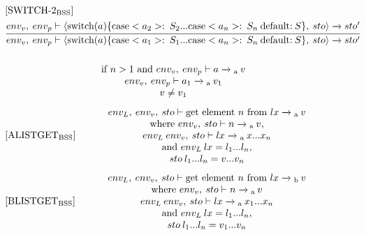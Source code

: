 \begin{equation}
\begin{split}
\begin{minipage}{\linewidth}
$[\text{SWITCH-2}_\text{BSS}]$
\end{minipage}
\\
\begin{minipage}{\linewidth}
\centering
$\cfrac
{
    env_v, \: env_p \vdash \langle  \text{switch}(a) \{\text{case} <a_2>: \: S_2 ... \text{case} <a_n>: \: S_n \: \text{default:} \: S\}, \: sto \rangle \xrightarrow{} sto'
}
{
    env_v, \: env_p \vdash \langle \text{switch}(a) \{\text{case} <a_1>: \: S_1 ... \text{case} <a_n>: \: S_n \: \text{default:} \: S\}, \: sto \rangle \xrightarrow{} sto' 
}$ 
\end{minipage}
\\\\
\begin{minipage}{\linewidth}
\centering
if $ n > 1$ and $env_v, \: env_p \vdash a \xrightarrow{}\textsubscript{a} \: v$
\\
$env_v, \: env_p \vdash a_1 \xrightarrow{}\textsubscript{a} \: v_1$
\\
$v \neq v_1$
\end{minipage}
\end{split}
\end{equation}


\begin{equation}
\begin{minipage}{.2\linewidth}
$[\text{ALISTGET}_\text{BSS}]$
\end{minipage}
\begin{minipage}{.8\linewidth}
\centering
$env_L, \: env_v, \: sto \vdash \text{get element } n \text{ from } lx \xrightarrow{}\textsubscript{a} \: v$
\\
where $env_v, \: sto \vdash n \xrightarrow{}\textsubscript{a} \: v$, \\$env_L \: env_v, \: sto \vdash lx \xrightarrow{}\textsubscript{a} \: x...x_n$ 
\\and $env_L \: lx = l_1... l_n$, \\ $sto \: l_1...l_n = v...v_n$
\end{minipage}
\end{equation}

\begin{equation}
\begin{minipage}{.2\linewidth}
$[\text{BLISTGET}_\text{BSS}]$
\end{minipage}
\begin{minipage}{.8\linewidth}
\centering
$env_L, \: env_v, \: sto \vdash \text{get element } n \text{ from } lx \xrightarrow{}\textsubscript{b} \: v$
\\
where $env_v, \: sto \vdash n \xrightarrow{}\textsubscript{a} \: v$ \\ $env_L \: env_v, \: sto \vdash lx \xrightarrow{}\textsubscript{a} \: x_1...x_n$ \\ and $env_L \: lx = l_1... l_n$, \\$sto \: l_1...l_n = v_1...v_n$
\end{minipage}
\end{equation}


